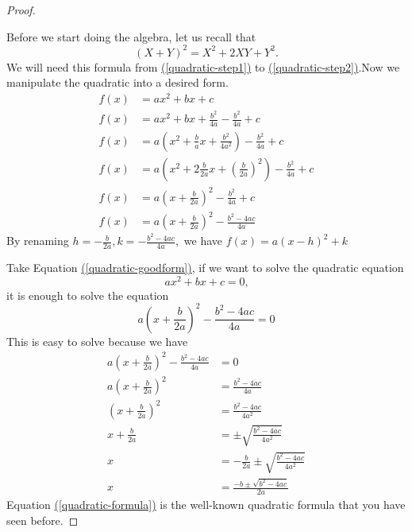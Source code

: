 \documentclass[10pt,]{article}
\theoremstyle{plain}
\theoremstyle{definition}
\numberwithin{equation}{section}
\newcommand{\amp}{&}
\begin{document}
\begin{proof}\hypertarget{proof-1}{}
\hypertarget{p-50}{}%
Before we start doing the algebra, let us recall that%
\begin{equation*}
(X+Y)^2=X^2+2XY+Y^2.
\end{equation*}
We will need this formula from \hyperref[quadratic-step1]{(\ref{quadratic-step1})} to \hyperref[quadratic-step2]{(\ref{quadratic-step2})}.Now we manipulate the quadratic into a desired form.%
\begin{align}
f(x) \amp = ax^2+bx+c\label{mrow-1}\\
f(x) \amp = ax^2+bx+\frac{b^2}{4a} - \frac{b^2}{4a}+c\label{mrow-2}\\
f(x) \amp = a(x^2+\frac{b}{a}x+\frac{b^2}{4a^2}) - \frac{b^2}{4a}+c\label{mrow-3}\\
f(x) \amp = a(x^2+2\frac{b}{2a}x + (\frac{b}{2a})^2) - \frac{b^2}{4a}+c\label{quadratic-step1}\\
f(x) \amp = a(x+\frac{b}{2a})^2-\frac{b^2}{4a}+c\label{quadratic-step2}\\
f(x) \amp = a(x+\frac{b}{2a})^2-\frac{b^2-4ac}{4a}\label{quadratic-goodform}
\end{align}
By renaming \(h = -\frac{b}{2a}, k = -\frac{b^2-4ac}{4a},\) we have \(f(x)=a(x-h)^2+k\)%
\par
\hypertarget{p-51}{}%
Take Equation \hyperref[quadratic-goodform]{(\ref{quadratic-goodform})}, if we want to solve the quadratic equation%
\begin{equation*}
ax^2+bx+c = 0\text{,}
\end{equation*}
it is enough to solve the equation%
\begin{equation*}
a(x+\frac{b}{2a})^2-\frac{b^2-4ac}{4a} = 0
\end{equation*}
This is easy to solve because we have%
\begin{align}
a(x+\frac{b}{2a})^2-\frac{b^2-4ac}{4a} \amp = 0\label{mrow-7}\\
a(x+\frac{b}{2a})^2 \amp = \frac{b^2-4ac}{4a}\label{mrow-8}\\
(x+\frac{b}{2a})^2 \amp = \frac{b^2-4ac}{4a^2}\label{mrow-9}\\
x+\frac{b}{2a} \amp = \pm \sqrt{\frac{b^2-4ac}{4a^2}}\label{mrow-10}\\
x \amp = -\frac{b}{2a} \pm \sqrt{\frac{b^2-4ac}{4a^2}} \label{mrow-11}\\
x \amp = \frac{-b\pm\sqrt{b^2-4ac}}{2a}\label{quadratic-formula}
\end{align}
Equation \hyperref[quadratic-formula]{(\ref{quadratic-formula})} is the well-known quadratic formula that you have seen before.%
\end{proof}
\end{document}
